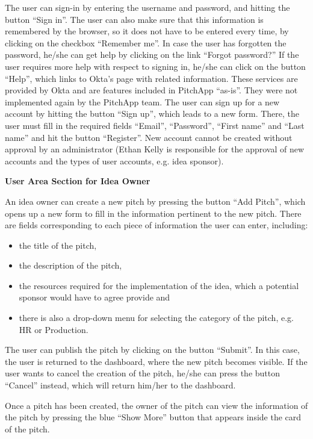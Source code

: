 The user can sign-in by entering the username and password, and hitting the button “Sign in”.
The user can also make sure that this information is remembered by the browser, so it does not have to be entered every time, by clicking on the checkbox “Remember me”.
In case the user has forgotten the password, he/she can get help by clicking on the link “Forgot password?”
If the user requires more help with respect to signing in, he/she can click on the button “Help”, which links to Okta’s page with related information.
These services are provided by Okta and are features included in PitchApp “as-is”. They were not implemented again by the PitchApp team.
The user can sign up for a new account by hitting the button “Sign up”, which leads to a new form. There, the user must fill in the required fields “Email”, “Password”, “First name” and “Last name” and hit the button “Register”.
New account cannot be created without approval by an administrator (Ethan Kelly is responsible for the approval of new accounts and the types of user accounts, e.g. idea sponsor).

\break
\textbf{User Area Section for Idea Owner}

An idea owner can create a new pitch by pressing the button “Add Pitch”, which opens up a new form to fill in the information pertinent to the new pitch. There are fields corresponding to each piece of information the user can enter, including:

\begin{itemize}
\item the title of the pitch,
\item the description of the pitch,
\item the resources required for the implementation of the idea, which a potential sponsor would have to agree provide and
\item there is also a drop-down menu for selecting the category of the pitch, e.g. HR or Production.
\end{itemize}

The user can publish the pitch by clicking on the button “Submit”. In this case, the user is returned to the dashboard, where the new pitch becomes visible.
If the user wants to cancel the creation of the pitch, he/she can press the button “Cancel” instead, which will return him/her to the dashboard.

Once a pitch has been created, the owner of the pitch can view the information of the pitch by pressing the blue “Show More” button that appears inside the card of the pitch.

